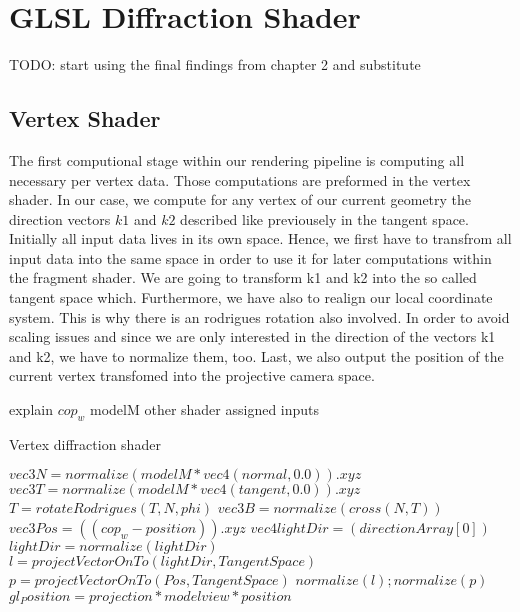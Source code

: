 \section{GLSL Diffraction Shader}
TODO: start using the final findings from chapter 2 and substitute

\subsection{Vertex Shader}
The first computional stage within our rendering pipeline is computing all necessary per vertex data. Those computations are preformed in the vertex shader. In our case, we compute for any vertex of our current geometry the direction vectors $k1$ and $k2$ described like previousely in the tangent space. Initially all input data lives in its own space. Hence, we first have to transfrom all input data into the same space in order to use it for later computations within the fragment shader. We are going to transform k1 and k2 into the so called tangent space which. Furthermore, we have also to realign our local coordinate system. This is why there is an rodrigues rotation also involved. In order to avoid scaling issues and since we are only interested in the direction of the vectors k1 and k2, we have to normalize them, too. Last, we also output the position of the current vertex transfomed into the projective camera space.
  
explain $cop_w$
modelM
other shader assigned inputs

\begin{algorithm}
  \caption{Vertex diffraction shader}
  \begin{algorithmic}
      \State $ vec3 N = normalize(modelM * vec4(normal,0.0)).xyz$
      \State $ vec3 T = normalize(modelM * vec4(tangent,0.0)).xyz$
      \State $ T = rotateRodrigues(T, N, phi)$
      \State $ vec3 B = normalize(cross(N, T))$
      \State $ vec3 Pos = ((cop_w-position)).xyz$
      \State $ vec4 lightDir = (directionArray[0])$
      \State $ lightDir = normalize(lightDir)$
      \State $ l = projectVectorOnTo(lightDir, TangentSpace)$
      \State $ p = projectVectorOnTo(Pos, TangentSpace)$
      \State $normalize(l); normalize(p)$
      \State $gl_Position = projection * modelview * position$
    \EndFor
  \end{algorithmic}
\end{algorithm}


